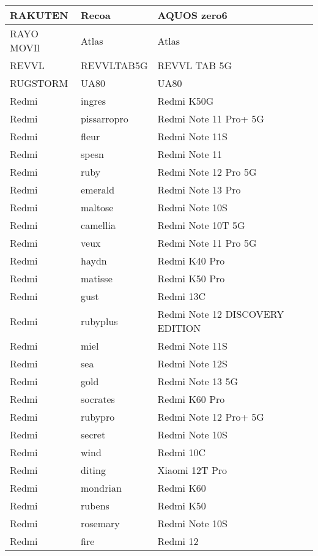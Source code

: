 \begin{tabularx}{\linewidth}{|l|X|X|}
        RAKUTEN & Recoa & AQUOS zero6 \\ \hline
        RAYO MOVIl & Atlas & Atlas \\ \hline
        REVVL & REVVLTAB5G & REVVL TAB 5G \\ \hline
        RUGSTORM & UA80 & UA80 \\ \hline
        Redmi & ingres & Redmi K50G \\ \hline
        Redmi & pissarropro & Redmi Note 11 Pro+ 5G \\ \hline
        Redmi & fleur & Redmi Note 11S \\ \hline
        Redmi & spesn & Redmi Note 11 \\ \hline
        Redmi & ruby & Redmi Note 12 Pro 5G \\ \hline
        Redmi & emerald & Redmi Note 13 Pro \\ \hline
        Redmi & maltose & Redmi Note 10S \\ \hline
        Redmi & camellia & Redmi Note 10T 5G \\ \hline
        Redmi & veux & Redmi Note 11 Pro 5G \\ \hline
        Redmi & haydn & Redmi K40 Pro \\ \hline
        Redmi & matisse & Redmi K50 Pro \\ \hline
        Redmi & gust & Redmi 13C \\ \hline
        Redmi & rubyplus & Redmi Note 12 DISCOVERY EDITION \\ \hline
        Redmi & miel & Redmi Note 11S \\ \hline
        Redmi & sea & Redmi Note 12S \\ \hline
        Redmi & gold & Redmi Note 13 5G \\ \hline
        Redmi & socrates & Redmi K60 Pro \\ \hline
        Redmi & rubypro & Redmi Note 12 Pro+ 5G \\ \hline
        Redmi & secret & Redmi Note 10S \\ \hline
        Redmi & wind & Redmi 10C \\ \hline
        Redmi & diting & Xiaomi 12T Pro \\ \hline
        Redmi & mondrian & Redmi K60 \\ \hline
        Redmi & rubens & Redmi K50 \\ \hline
        Redmi & rosemary & Redmi Note 10S \\ \hline
        Redmi & fire & Redmi 12 \\ \hline

\end{tabularx}
